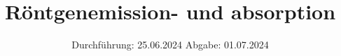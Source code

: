 

\subject{v602}
\title{Röntgenemission- und absorption}
\date{%
  Durchführung: 25.06.2024
  \hspace{3em}
  Abgabe: 01.07.2024
}



\maketitle
\thispagestyle{empty}
\tableofcontents
\newpage






\printbibliography{}

